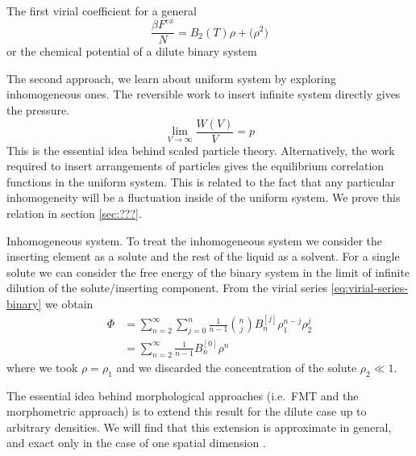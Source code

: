 \documentclass[11pt]{report}
\begin{document}
The first virial coefficient for a general
\begin{equation}
  \frac{\beta F^{ex}}{N} =
  B_2(T) \rho + \mathcal(\rho^2)
\end{equation}
or the chemical potential of a dilute binary system

The second approach, we learn about uniform system by exploring inhomogeneous ones.
The reversible work to insert infinite system directly gives the pressure.
\begin{equation}
  \lim_{V \to \infty} \frac{W(V)}{V} = p
\end{equation}
This is the essential idea behind scaled particle theory.
Alternatively, the work required to insert arrangements of particles gives the equilibrium correlation functions in the uniform system.
This is related to the fact that any particular inhomogeneity will be a fluctuation inside of the uniform system.
We prove this relation in section \ref{sec:???}.

Inhomogeneous system.
To treat the inhomogeneous system we consider the inserting element as a solute and the rest of the liquid as a solvent.
For a single solute we can consider the free energy of the binary system in the limit of infinite dilution of the solute/inserting component.
From the virial series \eqref{eq:virial-series-binary} we obtain
\begin{equation}
  \begin{aligned}
    \Phi &=
    \sum_{n=2}^\infty \sum_{j=0}^{n}
    \frac{1}{n-1} {n \choose j} B_n^{[j]} \rho_1^{n-j} \rho_2^j \\
    &=
    \sum_{n=2}^\infty
    \frac{1}{n-1} B_n^{[0]} \rho^n
  \end{aligned}
\end{equation}
where we took $\rho = \rho_1$ and we discarded the concentration of the solute $\rho_2 \ll 1$.

The essential idea behind morphological approaches (i.e.\ FMT and the morphometric approach) is to extend this result for the dilute case up to arbitrary densities.
We will find that this extension is approximate in general, and exact only in the case of one spatial dimension%
.
\end{document}
